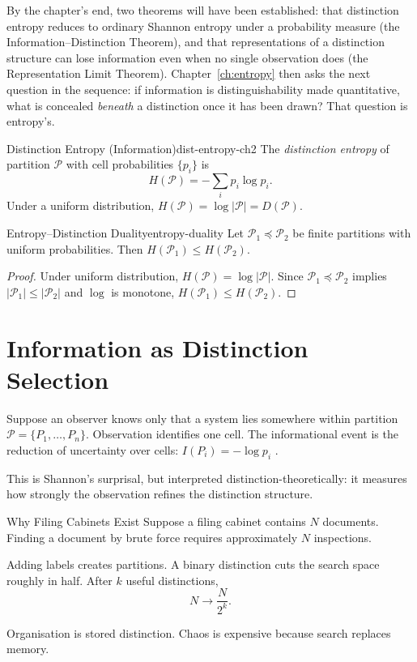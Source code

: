 \documentclass[12pt,twoside,openright]{book}
\newcommand{\partition}{\mathcal{P}}
\begin{document}
By the chapter's end, two theorems will have been established:
that distinction entropy reduces to ordinary Shannon entropy
under a probability measure (the Information--Distinction
Theorem), and that representations of a distinction structure
can lose information even when no single observation does (the
Representation Limit Theorem). Chapter~\ref{ch:entropy} then
asks the next question in the sequence: if information is
distinguishability made quantitative, what is concealed
\emph{beneath} a distinction once it has been drawn? That
question is entropy's.

\begin{definition}{Distinction Entropy (Information)}{dist-entropy-ch2}
  The \emph{distinction entropy} of partition $\partition$
  with cell probabilities $\{p_i\}$ is
  \[
    H(\partition) = -\sum_i p_i \log p_i.
  \]
  Under a uniform distribution,
  $H(\partition) = \log|\partition| = D(\partition)$.
\end{definition}

\begin{theorem}{Entropy--Distinction Duality}{entropy-duality}
  Let $\partition_1 \preceq \partition_2$ be finite
  partitions with uniform probabilities. Then
  $H(\partition_1) \le H(\partition_2)$.
\end{theorem}

\begin{proof}
  Under uniform distribution, $H(\partition) = \log|\partition|$.
  Since $\partition_1 \preceq \partition_2$ implies
  $|\partition_1| \le |\partition_2|$ and $\log$ is
  monotone, $H(\partition_1) \le H(\partition_2)$.
\end{proof}

\section{Information as Distinction Selection}
\label{sec:ch2-selection}

Suppose an observer knows only that a system lies
somewhere within partition $\partition = \{P_1,\ldots,P_n\}$.
Observation identifies one cell. The informational event
is the reduction of uncertainty over cells:
$I(P_i) = -\log p_i$ \parencite{shannon1948,mackay2003}.

This is Shannon's surprisal, but interpreted
distinction-theoretically: it measures how strongly the
observation refines the distinction structure.

\begin{envelopeaside}{Why Filing Cabinets Exist}
Suppose a filing cabinet contains $N$ documents. Finding a
document by brute force requires approximately $N$
inspections.

Adding labels creates partitions. A binary distinction cuts
the search space roughly in half. After $k$ useful
distinctions,
\[
  N \to \frac{N}{2^k}.
\]

Organisation is stored distinction. Chaos is expensive
because search replaces memory.
\end{envelopeaside}
\end{document}

